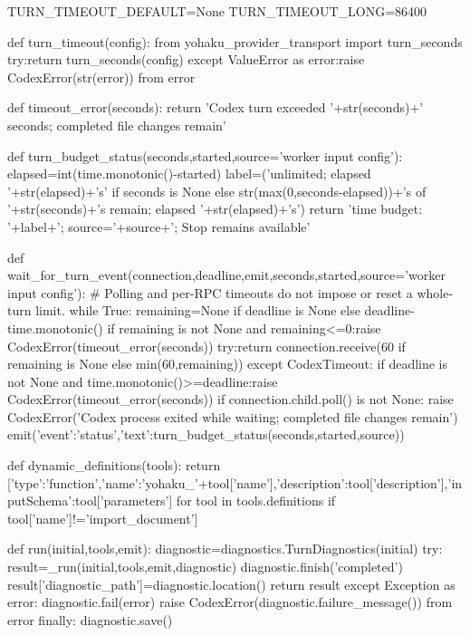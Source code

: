 TURN_TIMEOUT_DEFAULT=None
TURN_TIMEOUT_LONG=86400

def turn_timeout(config):
    from yohaku_provider_transport import turn_seconds
    try:return turn_seconds(config)
    except ValueError as error:raise CodexError(str(error)) from error


def timeout_error(seconds):
    return 'Codex turn exceeded '+str(seconds)+' seconds; completed file changes remain'

def turn_budget_status(seconds,started,source='worker input config'):
    elapsed=int(time.monotonic()-started)
    label=('unlimited; elapsed '+str(elapsed)+'s' if seconds is None else
           str(max(0,seconds-elapsed))+'s of '+str(seconds)+'s remain; elapsed '+str(elapsed)+'s')
    return 'time budget: '+label+'; source='+source+'; Stop remains available'

def wait_for_turn_event(connection,deadline,emit,seconds,started,source='worker input config'):
    # Polling and per-RPC timeouts do not impose or reset a whole-turn limit.
    while True:
        remaining=None if deadline is None else deadline-time.monotonic()
        if remaining is not None and remaining<=0:raise CodexError(timeout_error(seconds))
        try:return connection.receive(60 if remaining is None else min(60,remaining))
        except CodexTimeout:
            if deadline is not None and time.monotonic()>=deadline:raise CodexError(timeout_error(seconds))
            if connection.child.poll() is not None:
                raise CodexError('Codex process exited while waiting; completed file changes remain')
            emit({'event':'status','text':turn_budget_status(seconds,started,source)})


def dynamic_definitions(tools):
    return [{'type':'function','name':'yohaku_'+tool['name'],'description':tool['description'],'inputSchema':tool['parameters']} for tool in tools.definitions if tool['name']!='import_document']

def run(initial,tools,emit):
    diagnostic=diagnostics.TurnDiagnostics(initial)
    try:
        result=_run(initial,tools,emit,diagnostic)
        diagnostic.finish('completed')
        result['diagnostic_path']=diagnostic.location()
        return result
    except Exception as error:
        diagnostic.fail(error)
        raise CodexError(diagnostic.failure_message()) from error
    finally:
        diagnostic.save()


